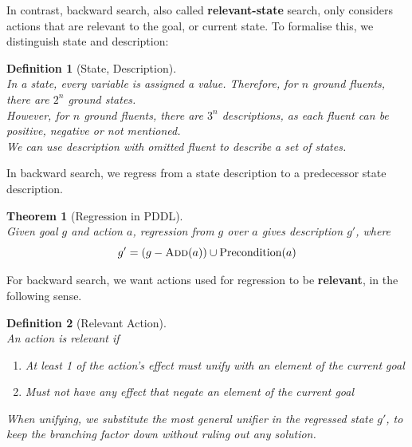\documentclass[12pt]{article}
\newtheorem{definition}{Definition}[section]
\newtheorem{theorem}{Theorem}[section]
\theoremstyle{definition}
\begin{document}
In contrast, backward search, also called \textbf{relevant-state} search, only considers actions that are relevant to the goal, or current state. To formalise this, we distinguish state and description:
\begin{definition}[State, Description]
\hfill\\\normalfont In a state, every variable is assigned a value. Therefore, for $n$ ground fluents, there are $2^n$ ground states.\\
However, for $n$ ground fluents, there are $3^n$ descriptions, as each fluent can be positive, negative or not mentioned.\\
We can use description with omitted fluent to describe a set of states.
\end{definition}
In backward search, we regress from a state description to a predecessor state description.
\begin{theorem}[Regression in PDDL]
\hfill\\\normalfont Given goal $g$ and action $a$, regression from $g$ over $a$ gives description $g'$, where
\[
g'=(g-\textsc{Add}(a))\cup\text{Precondition}(a)
\]
\end{theorem}
For backward search, we want actions used for regression to be \textbf{relevant}, in the following sense.
\begin{definition}[Relevant Action]
\hfill\\\normalfont An action is relevant if
\begin{enumerate}
	\item At least 1 of the action's effect must unify with an element of the current goal
	\item Must not have any effect that negate an element of the current goal
\end{enumerate}
When unifying, we substitute the most general unifier in the regressed state $g'$, to keep the branching factor down without ruling out any solution.
\end{definition}
\end{document}

